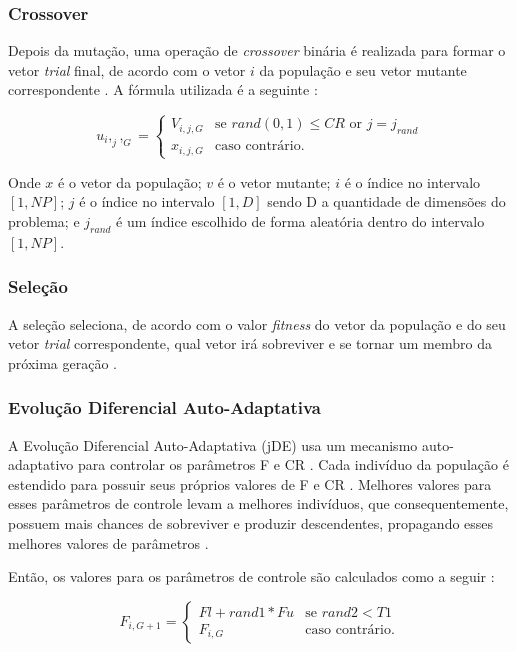 \subsubsection{Crossover}

Depois da mutação, uma operação de \textit{crossover} binária é realizada para formar o vetor \textit{trial} final, de acordo com o vetor $i$ da população e seu vetor mutante correspondente \cite{brest}. A fórmula utilizada é a seguinte \cite{brest}:

\begin{equation}
u_i,_j,_G = 
\begin{cases}
	V_{i,j,G}    & \text{se $rand(0, 1) \leq CR$ or $j = j_{rand}$}\\
    x_{i,j,G} & \text{caso contrário.}
\end{cases}
\end{equation}

Onde $x$ é o vetor da população; $v$ é o vetor mutante; $i$ é o índice no intervalo $[1, NP]$; $j$ é o índice no intervalo $[1, D]$ sendo D a quantidade de dimensões do problema; e $j_{rand}$ é um índice escolhido de forma aleatória dentro do intervalo $[1, NP]$. 

\subsubsection{Seleção}

A seleção seleciona, de acordo com o valor \textit{fitness} do vetor da população e do seu vetor \textit{trial} correspondente, qual vetor irá sobreviver e se tornar um membro da próxima geração \cite{brest}.

\subsubsection{Evolução Diferencial Auto-Adaptativa}

A Evolução Diferencial Auto-Adaptativa (jDE) usa um mecanismo auto-adaptativo para controlar os parâmetros F e CR \cite{brest}. Cada indivíduo da população é estendido para possuir seus próprios valores de F e CR \cite{brest}. Melhores valores para esses parâmetros de controle levam a melhores indivíduos, que consequentemente, possuem mais chances de sobreviver e produzir descendentes, propagando esses melhores valores de parâmetros \cite{brest}.

Então, os valores para os parâmetros de controle são calculados como a seguir \cite{brest}:

\begin{equation}
F_{i,G+1} = 
\begin{cases}
	Fl + rand1 * Fu    & \text{se $rand2 < T1$}\\
    F_{i,G} & \text{caso contrário.}
\end{cases}
\end{equation}


